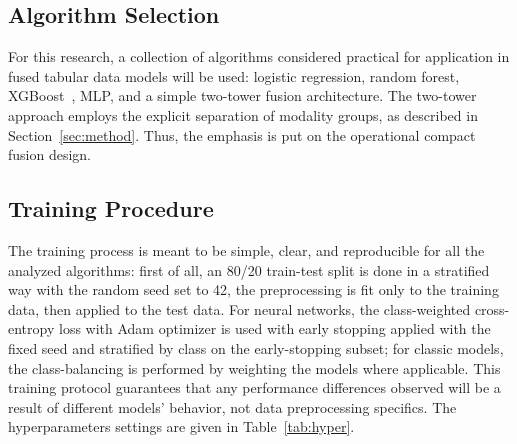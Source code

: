 \documentclass[a4paper,twoside]{article}
\begin{document}
\subsection{Algorithm Selection}

\noindent For this research, a collection of algorithms considered practical for application in fused tabular data models will be used: logistic regression, random forest, \ac{XGBoost}~\cite{chen2016xgboost}, \ac{MLP}, and a simple two-tower fusion architecture. The two-tower approach employs the explicit separation of modality groups, as described in Section~\ref{sec:method}. Thus, the emphasis is put on the operational compact fusion design.

\subsection{Training Procedure}

\noindent The training process is meant to be simple, clear, and reproducible for all the analyzed algorithms: first of all, an 80/20 train-test split is done in a stratified way with the random seed set to 42, the preprocessing is fit only to the training data, then applied to the test data. For neural networks, the class-weighted cross-entropy loss with Adam optimizer is used with early stopping applied with the fixed seed and stratified by class on the early-stopping subset; for classic models, the class-balancing is performed by weighting the models where applicable. This training protocol guarantees that any performance differences observed will be a result of different models' behavior, not data preprocessing specifics. The hyperparameters settings are given in Table~\ref{tab:hyper}.
\end{document}
